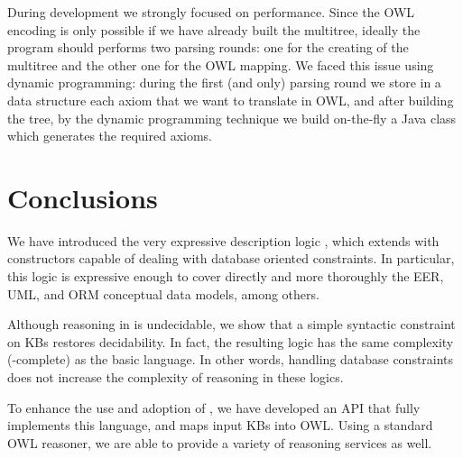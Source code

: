 \documentclass[draft]{article}
\begin{document}
During development we strongly focused on performance. Since the OWL encoding is only possible if we have already built the multitree, ideally the program should performs two parsing rounds: one for the creating of the multitree and the other one for the OWL mapping. We faced this issue using dynamic programming: during the first (and only) parsing round we store in a data structure each axiom that we want to translate in OWL, and after building the tree, by the dynamic programming technique we build on-the-fly a Java class which generates the required axioms.

\section{Conclusions}

We have introduced the very expressive description logic \DLRp{}\negmedspace, which extends \DLR with constructors capable of dealing with database oriented constraints. In particular, this logic is expressive enough to cover directly and more thoroughly the EER, UML, and ORM conceptual data models, among others.

Although reasoning in \DLRp is undecidable, we show that a simple syntactic constraint on KBs restores decidability. In fact, the resulting logic \DLRpm has the same complexity (\ExpTime-complete) as the basic \DLR language. In other words, handling database constraints does not increase the complexity of reasoning in these logics.

To enhance the use and adoption of \DLRpm, we have developed an API that fully implements
this language, and maps input KBs into OWL. Using a standard OWL reasoner, we are able to
provide a variety of \DLRpm reasoning services as well. 





\cleardoublepage



\end{document}
